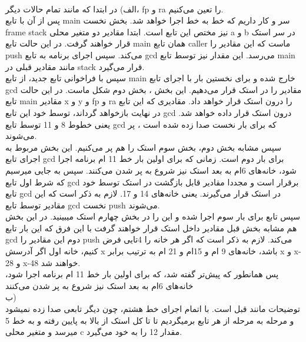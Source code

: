 
\\

الف)
در ابتدا که مانند تمام حالات دیگر، fp
و ra
را تعین می‌کنیم.
\\
پس از آن با تابع
main
سر و کار داریم که خط به خط اجرا خواهد شد. بخش نخست
frame
stack 
نیز مختص این تابع است.
ابتدا مقادیر دو متغیر محلی 
a
و
b
 در سر استک قرار خواهند گرفت. در این حالت تابع main
 همان تابع caller
 ماست که این مقادیر را push
 می‌کند.
 سپس اجرای برنامه به تابع gcd
 می‌رسد.
 این مقدار نیز توسط تابع main
 مانند مقادیر قبلی در stack
 قرار می‌گیرد.
 \\
 سپس با فراخوانی تابع جدید، از تابع main خارج شده
 و برای نخستین بار با اجرای تابع gcd
 مقادیر را در استک قرار می‌دهیم.
 این بخش ، بخش دوم شکل ماست.
 در این حالت تابع main
 مقادیر x
 و
 y
 و 
 fp
 و
 ra
 را درون استک قرار خواهد داد.
مقادیری که این تابع در نهایت بازخواهد گرداند، توسط خود این تابع 
gcd
درون استک قرار داده خواهد شد. 
یعنی خطوط 8 و 11 توسط تابع gcd
که برای بار نخست صدا زده شده است ، پر می‌شوند.
\\
سپس مشابه بخش دوم، بخش سوم استک را هم پر می‌کنیم.
این بخش مربوط به اجرای تابع 
gcd
برای بار دوم است.
زمانی که برای اولین بار خط 11 ام برنامه اجرا شود،
خانه‌های 6ام به بعد استک نیز شروع به پر شدن می‌کنند.
سپس به جایی میرسیم که شرط اول تابع 
gcd
برقرار است و مجددا مقادیر قابل بازگشت در استک توسط خود تابع
gcd
در استک قرار می‌گیرند. یعنی خانه‌های 14 و 17.
لازم به ذکر است که این مقادیر توسط تابع gcd
نخست push می‌شوند.
\\
سپس تابع برای بار سوم اجرا شده و این را در بخش چهارم استک میبینید.
در این بخش هم 
مشابه بخش قبل مقادیر داخل استک قرار خواهند گرفت با این فرق که این بار تابع
gcd
دوم
این مقادیر را push
می‌کند.
لازم به ذکر است که اگر هر خانه را 4تایی فرض کنیم،
خانه اول اگر آدرسش x
باشد،
خانه‌های 9 ام و 15ام و 21 ام به ترتیب برابر 
x
و
x-28
و
x-48
خواهند شد.
\\
پس همانطور که پیش‌تر گفته شد،
که برای اولین بار خط 11 ام برنامه اجرا شود،
خانه‌های 6ام به بعد استک نیز شروع به پر شدن می‌کنند
\\
ب)
\\
توضیحات مانند قبل است.
با اتمام اجرای خط هشتم،
چون دیگر تابعی صدا زده نمیشود و مرحله به مرحله از هر تابع برمیگردیم تا تا کل استک از بالا به پایین 
رفته و به خط 5 میرسد و متغیر محلی
c
مقدار 12 را به خود می‌گیرد.


